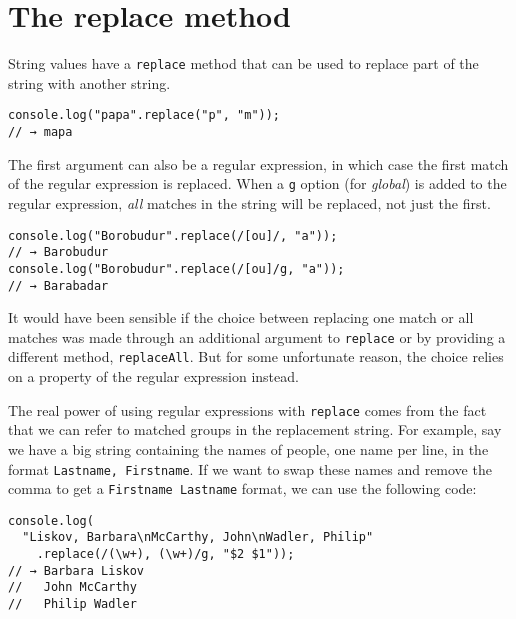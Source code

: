 \section{The replace method}

String values have a \lstinline`replace` method that can be used to replace part of the string with another string.

\begin{lstlisting}
console.log("papa".replace("p", "m"));
// → mapa
\end{lstlisting}
\noindent{}

The first argument can also be a regular expression, in which case the first match of the regular expression is replaced. When a \lstinline`g` option (for \emph{global}) is added to the regular expression, \emph{all} matches in the string will be replaced, not just the first.

\begin{lstlisting}
console.log("Borobudur".replace(/[ou]/, "a"));
// → Barobudur
console.log("Borobudur".replace(/[ou]/g, "a"));
// → Barabadar
\end{lstlisting}
\noindent{}

It would have been sensible if the choice between replacing one match or all matches was made through an additional argument to \lstinline`replace` or by providing a different method, \lstinline`replaceAll`. But for some unfortunate reason, the choice relies on a property of the regular expression instead.

The real power of using regular expressions with \lstinline`replace` comes from the fact that we can refer to matched groups in the replacement string. For example, say we have a big string containing the names of people, one name per line, in the format \lstinline`Lastname, Firstname`. If we want to swap these names and remove the comma to get a \lstinline`Firstname Lastname` format, we can use the following code:

\begin{lstlisting}
console.log(
  "Liskov, Barbara\nMcCarthy, John\nWadler, Philip"
    .replace(/(\w+), (\w+)/g, "$2 $1"));
// → Barbara Liskov
//   John McCarthy
//   Philip Wadler
\end{lstlisting}
\noindent

